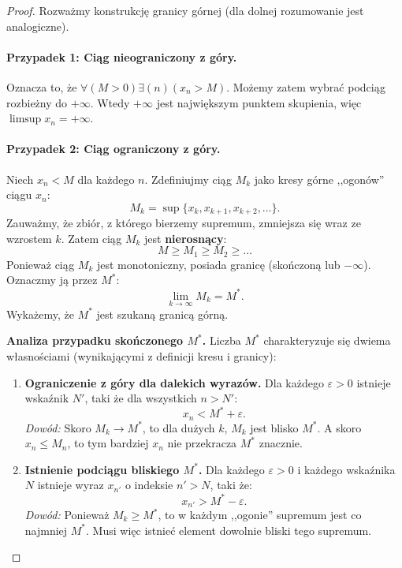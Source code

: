 \begin{proof}
    Rozważmy konstrukcję granicy górnej (dla dolnej rozumowanie jest analogiczne).
    
    \paragraph{Przypadek 1: Ciąg nieograniczony z góry.}
    Oznacza to, że $\forall\left(M>0\right)\exists\left(n\right) (x_{n} > M)$. Możemy zatem wybrać podciąg rozbieżny do $+\infty$. Wtedy $+\infty$ jest największym punktem skupienia, więc $\limsup x_n = +\infty$.

    \paragraph{Przypadek 2: Ciąg ograniczony z góry.}
    Niech $x_n < M$ dla każdego $n$. Zdefiniujmy ciąg $M_k$ jako kresy górne ,,ogonów'' ciągu $x_n$:
    \[
        M_k = \sup \{x_k, x_{k+1}, x_{k+2}, \ldots \}.
    \]
    Zauważmy, że zbiór, z którego bierzemy supremum, zmniejsza się wraz ze wzrostem $k$. Zatem ciąg $M_k$ jest \textbf{nierosnący}:
    \[
        M \ge M_1 \ge M_2 \ge \ldots
    \]
    Ponieważ ciąg $M_k$ jest monotoniczny, posiada granicę (skończoną lub $-\infty$). Oznaczmy ją przez $M^*$:
    \[
        \lim_{k \to \infty} M_k = M^*.
    \]
    Wykażemy, że $M^*$ jest szukaną granicą górną.
    
    \medskip
    \noindent \textbf{Analiza przypadku skończonego $M^*$.}
    Liczba $M^*$ charakteryzuje się dwiema własnościami (wynikającymi z definicji kresu i granicy):
    
    \begin{enumerate}[label=\textbf{\Roman*.}]
        \item \textbf{Ograniczenie z góry dla dalekich wyrazów.}
        Dla każdego $\varepsilon > 0$ istnieje wskaźnik $N'$, taki że dla wszystkich $n > N'$:
        \[ x_n < M^* + \varepsilon. \]
        \textit{Dowód:} Skoro $M_k \to M^*$, to dla dużych $k$, $M_k$ jest blisko $M^*$. A skoro $x_n \le M_n$, to tym bardziej $x_n$ nie przekracza $M^*$ znacznie.
        
        \item \textbf{Istnienie podciągu bliskiego $M^*$.}
        Dla każdego $\varepsilon > 0$ i każdego wskaźnika $N$ istnieje wyraz $x_{n'}$ o indeksie $n' > N$, taki że:
        \[ x_{n'} > M^* - \varepsilon. \]
        \textit{Dowód:} Ponieważ $M_k \ge M^*$, to w każdym ,,ogonie'' supremum jest co najmniej $M^*$. Musi więc istnieć element dowolnie bliski tego supremum.
    \end{enumerate}


\end{proof}
